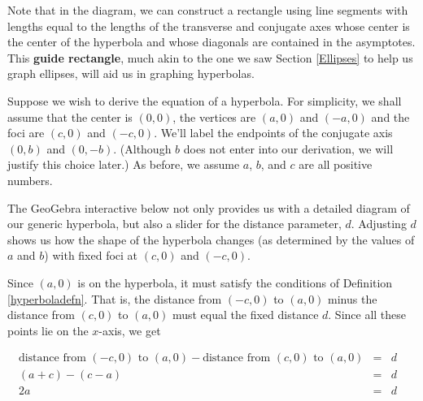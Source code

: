 \documentclass{ximera}
\begin{document}
\begin{center}


\end{center}



Note that in the diagram, we can construct a rectangle using line segments with lengths equal to the lengths of the transverse and conjugate axes whose center is the center of the hyperbola and whose diagonals are contained in the asymptotes.  This \textbf{guide rectangle}, much akin to the one we saw Section \ref{Ellipses} to help us graph ellipses, will aid us in graphing hyperbolas.



Suppose we wish to derive the equation of a hyperbola.  For simplicity, we shall assume that the center is $(0,0)$,  the vertices are $(a,0)$ and $(-a,0)$ and the foci are $(c,0)$ and $(-c,0)$.  We'll label the endpoints of the conjugate axis $(0,b)$ and $(0,-b)$.  (Although $b$ does not enter into our derivation, we will justify this choice later.)  As before, we assume $a$, $b$, and $c$ are all positive numbers.  

The GeoGebra interactive below not only provides us with a detailed diagram of our generic hyperbola, but also a slider for the distance parameter, $d$.  Adjusting $d$ shows us how the shape of the hyperbola changes (as determined by the values of $a$ and $b$) with fixed foci at $(c,0)$ and $(-c,0)$.  

\begin{center}
\end{center}



Since $(a,0)$ is on the hyperbola, it must satisfy the conditions of Definition \ref{hyperboladefn}.  That is, the distance from $(-c,0)$ to $(a,0)$ minus the distance from $(c,0)$ to $(a,0)$ must equal the fixed distance $d$.  Since all these points lie on the $x$-axis, we get

\[ \begin{array}{rclr} \mbox{distance from $(-c,0)$ to $(a,0)$} - \mbox{distance from $(c,0)$ to $(a,0)$} & = & d & \\ (a+c) - (c-a) & = & d & \\
2a & = & d \\ \end{array}\]
\end{document}
